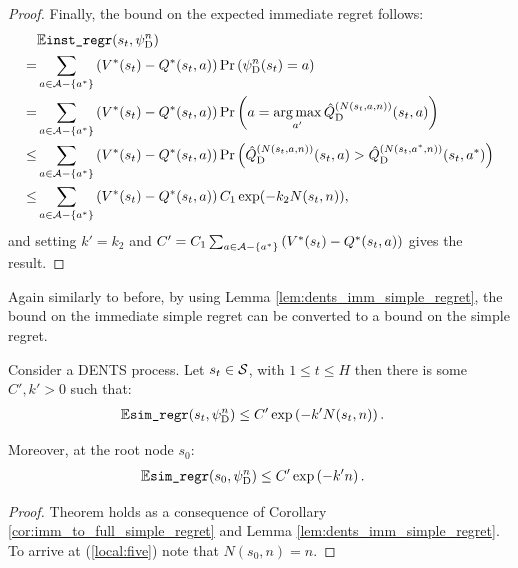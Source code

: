 \begin{proof}
        Finally, the bound on the expected immediate regret follows:
        \begin{align}
            & \mathbb{E}{\textnormal{\texttt{inst\_regr}}}(s_t,{\psi^{n}_{{\textnormal{D}}}})  \\
                =& \sum_{a\in\mathcal{A}-\{a^*\}} 
                    \left(V^*(s_t)-Q^*(s_t,a)\right) \Pr\left({\psi^{n}_{{\textnormal{D}}}}(s_t) =a \right) \\
                =& \sum_{a\in\mathcal{A}-\{a^*\}} 
                    \left(V^*(s_t)-Q^*(s_t,a)\right) \Pr\left(a = \operatorname*{arg\,max}_{a'} {\hat{Q}^{(N(s_t,a,n))}_{{\textnormal{D}}}}(s_t,a) \right) \\
                \leq& \sum_{a\in\mathcal{A}-\{a^*\}} 
                    \left(V^*(s_t)-Q^*(s_t,a)\right) 
                    \Pr\left({\hat{Q}^{(N(s_t,a,n))}_{{\textnormal{D}}}}(s_t,a) > {\hat{Q}^{(N(s_t,a^*,n))}_{{\textnormal{D}}}}(s_t,a^*)  \right) \\
                \leq&  \sum_{a\in\mathcal{A}-\{a^*\}} 
                    \left(V^*(s_t)-Q^*(s_t,a)\right) C_1 \exp(-k_2N(s_t,n)),
        \end{align}
        and setting $k'=k_2$ and $C'=C_1\sum_{a\in\mathcal{A}-\{a^*\}} \left(V^*(s_t)-Q^*(s_t,a)\right)$ gives the result.
    \end{proof}











    
    Again similarly to before, by using Lemma \ref{lem:dents_imm_simple_regret}, the bound on the immediate simple regret can be converted to a bound on the simple regret.
        
    \begin{theorem} \label{thrm:dents_simple_regret_converge}
        Consider a DENTS process. Let $s_t\in\mathcal{S}$, with $1\leq t \leq H$  then there is some $C',k'>0$ such that:
        \begin{align}
            \mathbb{E} {\textnormal{\texttt{sim\_regr}}}(s_{t},{\psi^{n}_{{\textnormal{D}}}}) &\leq C'\exp\left( -k' N(s_{t},n) \right).
        \end{align}
        
        Moreover, at the root node $s_0$:
        \begin{align}
            \mathbb{E} {\textnormal{\texttt{sim\_regr}}}(s_{0},{\psi^{n}_{{\textnormal{D}}}}) &\leq C'\exp\left( -k'n \right). \label{local:five}
        \end{align}
    \end{theorem}
    \begin{proof}
        Theorem holds as a consequence of Corollary \ref{cor:imm_to_full_simple_regret} and Lemma \ref{lem:dents_imm_simple_regret}. To arrive at (\ref{local:five}) note that $N(s_0,n)=n$.
    \end{proof}















